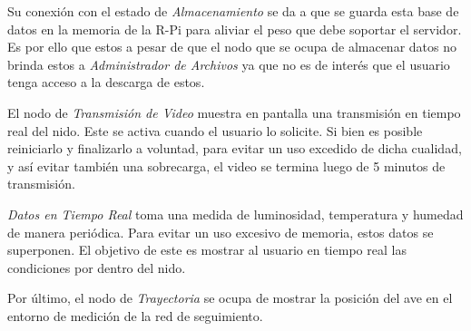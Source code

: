 Su conexión con el estado de \textit{Almacenamiento} se da a que se guarda esta base de datos en la memoria de la R-Pi para aliviar el peso que debe soportar el servidor. Es por ello que estos a pesar de que el nodo que se ocupa de almacenar datos no brinda estos a \textit{Administrador de Archivos} ya que no es de interés que el usuario tenga acceso a la descarga de estos.

El nodo de \textit{Transmisión de Video} muestra en pantalla una transmisión en tiempo real del nido. Este se activa cuando el usuario lo solicite. Si bien es posible reiniciarlo y finalizarlo a voluntad, para evitar un uso excedido de dicha cualidad, y así evitar también una sobrecarga, el video se termina luego de 5 minutos de transmisión.

\textit{Datos en Tiempo Real} toma una medida de luminosidad, temperatura y humedad de manera periódica. Para evitar un uso excesivo de memoria, estos datos se superponen. El objetivo de este es mostrar al usuario en tiempo real las condiciones por dentro del nido.

Por último, el nodo de \textit{Trayectoria} se ocupa de mostrar la posición del ave en el entorno de medición de la red de seguimiento.